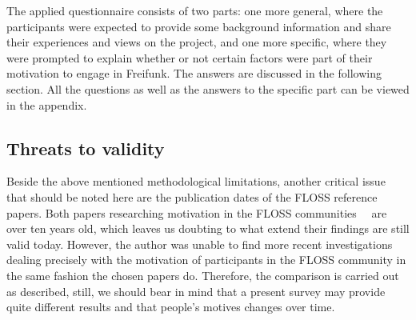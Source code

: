 The applied questionnaire consists of two parts: one more general, where the participants were expected to provide some background information and share their experiences and views on the project, and one more specific, where they were prompted to explain whether or not certain factors were part of their motivation to engage in Freifunk.
The answers are discussed in the following section.
All the questions as well as the answers to the specific part can be viewed in the appendix.

\subsection{Threats to validity}
Beside the above mentioned methodological limitations,
another critical issue that should be noted here are the publication dates of the FLOSS reference papers.
Both papers researching motivation in the FLOSS communities~\cite{HarOu2002}~\cite{LakWo2005} are over ten years old, which leaves us doubting to what extend their findings are still valid today.
However, the author was unable to find more recent investigations dealing precisely with the motivation of participants in the FLOSS community in the same fashion the chosen papers do.
Therefore, the comparison is carried out as described, still, we should bear in mind that a present survey may provide quite different results and that people's motives changes over time.

\begin{comment}
\begin{itemize}
  \item literature review for FLOSS <-- only as comparison
  \item semi-structured interviews for Freifunk <-- focus
    \begin{itemize}
      \item limitations of the methodology
    \end{itemize}
\end{itemize}
\end{comment}
